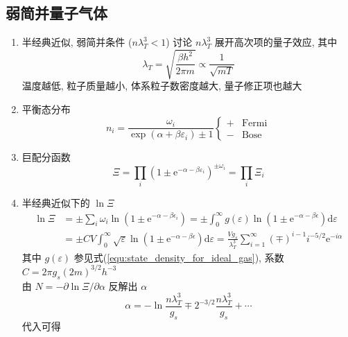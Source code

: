 \documentclass[12pt,a4paper]{article}%
\numberwithin{equation}{section}
\newcommand{\dif}{\mathrm{d}}
\newcommand\e{\mathrm{e}}%
\begin{document}
\subsection{弱简并量子气体} %
\label{sub:degenerate_quantum_gas}
\begin{enumerate}
    \item 半经典近似, 弱简并条件 ($n\lambda_T^3 < 1$) 
    讨论 $n\lambda_T^3$ 展开高次项的量子效应, 其中
    \begin{equation}
        \lambda_T = \sqrt{\frac{\beta h^2}{2\pi m}}\propto\frac 1{\sqrt{mT}}
    \end{equation}
    温度越低, 粒子质量越小, 体系粒子数密度越大, 量子修正项也越大
    \item 平衡态分布
    \begin{equation}
        n_i = \frac{\omega_i}{\exp(\alpha+\beta\varepsilon_i)\pm 1}
        \left\{\begin{array}{ll}
        + &\mbox{Fermi} \\
        - &\mbox{Bose}
        \end{array}\right.
    \end{equation}
    \item 巨配分函数
    \begin{equation}
        \Xi =\prod_i \left(1\pm\e^{-\alpha-\beta\varepsilon_i}\right)^{\pm\omega_i}
        = \prod_i\Xi_i
    \end{equation}
    \item 半经典近似下的 $\ln\Xi$
    \begin{align}
        \ln\Xi &= \pm\sum_i\omega_i\ln\left(1\pm\e^{-\alpha-\beta\epsilon_i}\right) 
        = \pm\int_0^\infty g(\varepsilon)\ln\left(1\pm\e^{-\alpha-\beta\epsilon}\right)\dif\varepsilon \nonumber\\
        &= \pm CV\int_0^\infty \sqrt\varepsilon\ln\left(1\pm\e^{-\alpha-\beta\epsilon}\right)\dif\varepsilon 
        = \frac{Vg_s}{\lambda_T^{3}}\sum_{i=1}^\infty(\mp)^{i-1}i^{-5/2}\e^{-i\alpha}
    \end{align}
    其中 $g(\varepsilon)$ 参见式(\ref{equ:state_density_for_ideal_gas}), 系数 $C = 2\pi g_s (2m)^{3/2} h^{-3}$\\
    由 $N = -\partial\ln\Xi/\partial\alpha$ 反解出 $\alpha$ 
    \begin{equation}
        \alpha = -\ln\frac{n\lambda_T^3}{g_s} \mp 2^{-3/2}\frac{n\lambda_T^3}{g_s} + \cdots
    \end{equation}
    代入可得
    \begin{equation}

\end{equation}
\end{enumerate}
\end{document}
